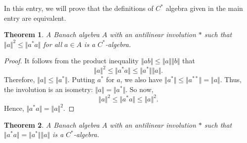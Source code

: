 \documentclass[12pt]{article}
\newcommand*{\norm}[1]{\Vert #1\Vert}
\newtheorem{thm}{Theorem}
\begin{document}
In this entry, we will prove that the definitions of $C^*$ algebra given in the 
main entry are equivalent.

\begin{thm}
A Banach algebra $A$ with an antilinear involution $*$ such that
$\norm{a}^2 \leq \norm{a^* a}$ for all $a \in A$ is a $C^*$-algebra.
\end{thm}

\begin{proof}
It follows from the product inequality $\norm{ab} \leq \norm{a}\norm{b}$ that
\[ \norm{a}^2 \leq \norm{a^* a} \leq \norm{a^*}\norm{a}. \]
Therefore, $\norm{a} \leq \norm{a^*}$. Putting $a^*$ for $a$, we also have $\norm{a^*} \leq \norm{a^{**}} = \norm{a}$. Thus, the involution is an isometry: $\norm{a} = \norm{a^*}$.
So now,
\[ \norm{a}^2 \leq \norm{a^* a} \leq \norm{a}^2. \]
Hence, $\norm{a^* a} = \norm{a}^2$.
\end{proof}

\begin{thm}
A Banach algebra $A$ with an antilinear involution $*$ such that
$\norm{a^* a} = \norm{a^*}\norm{a}$ is a $C^*$-algebra.
\end{thm}
\end{document}
